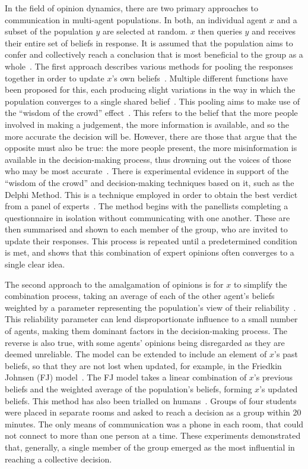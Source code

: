 In the field of opinion dynamics, there are two primary approaches to communication in multi-agent populations. In both, an individual agent $x$ and a subset of the population $y$ are selected at random. $x$ then queries $y$ and receives their entire set of beliefs in response. It is assumed that the population aims to confer and collectively reach a conclusion that is most beneficial to the group as a whole~\cite{Rawls1971AJustice}. The first approach describes various methods for pooling the responses together in order to update $x$'s own beliefs~\cite{Degroot1974ReachingConsensus}. Multiple different functions have been proposed for this, each producing slight variations in the way in which the population converges to a single shared belief~\cite{Lee2018CombiningConsensus}. This pooling aims to make use of the ``wisdom of the crowd'' effect~\cite{Golub2010NaiveCrowds}. This refers to the belief that the more people involved in making a judgement, the more information is available, and so the more accurate the decision will be. However, there are those that argue that the opposite must also be true: the more people present, the more misinformation is available in the decision-making process, thus drowning out the voices of those who may be most accurate~\cite{Dalkey1963AnExperts}. There is experimental evidence in support of the ``wisdom of the crowd'' and decision-making techniques based on it, such as the Delphi Method. This is a technique employed in order to obtain the best verdict from a panel of experts~\cite{Dalkey1963AnExperts}. The method begins with the panellists completing a questionnaire in isolation without communicating with one another. These are then summarised and shown to each member of the group, who are invited to update their responses. This process is repeated until a predetermined condition is met, and shows that this combination of expert opinions often converges to a single clear idea. 

The second approach to the amalgamation of opinions is for $x$ to simplify the combination process, taking an average of each of the other agent's beliefs weighted by a parameter representing the population's view of their reliability~\cite{Hegselmann2002OpinionSimulation}. This reliability parameter can lend disproportionate influence to a small number of agents, making them dominant factors in the decision-making process. The reverse is also true, with some agents' opinions being disregarded as they are deemed unreliable. The model can be extended to include an element of $x$'s past beliefs, so that they are not lost when updated, for example, in the Friedkin Johnsen (FJ) model~\cite{Friedkin1999SocialChange}. The FJ model takes a linear combination of $x$'s previous beliefs and the weighted average of the population's beliefs, forming $x$'s updated beliefs. This method has also been trialled on humans~\cite{Friedkin2011APower}. Groups of four students were placed in separate rooms and asked to reach a decision as a group within 20 minutes. The only means of communication was a phone in each room, that could not connect to more than one person at a time. These experiments demonstrated that, generally, a single member of the group emerged as the most influential in reaching a collective decision. 

